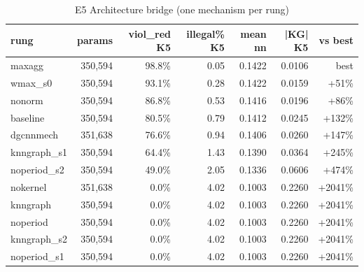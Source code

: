 \begin{table}[t]
\centering
\begin{tabular}{lrrrrrr}
\hline
rung & params & viol_red K5 & illegal\% K5 & mean nn & |KG| K5 & vs best \\
\hline
maxagg & 350,594 & 98.8\% & 0.05 & 0.1422 & 0.0106 & best \\
wmax_s0 & 350,594 & 93.1\% & 0.28 & 0.1422 & 0.0159 & +51\% \\
nonorm & 350,594 & 86.8\% & 0.53 & 0.1416 & 0.0196 & +86\% \\
baseline & 350,594 & 80.5\% & 0.79 & 0.1412 & 0.0245 & +132\% \\
dgcnnmech & 351,638 & 76.6\% & 0.94 & 0.1406 & 0.0260 & +147\% \\
knngraph_s1 & 350,594 & 64.4\% & 1.43 & 0.1390 & 0.0364 & +245\% \\
noperiod_s2 & 350,594 & 49.0\% & 2.05 & 0.1336 & 0.0606 & +474\% \\
nokernel & 351,638 & 0.0\% & 4.02 & 0.1003 & 0.2260 & +2041\% \\
knngraph & 350,594 & 0.0\% & 4.02 & 0.1003 & 0.2260 & +2041\% \\
noperiod & 350,594 & 0.0\% & 4.02 & 0.1003 & 0.2260 & +2041\% \\
knngraph_s2 & 350,594 & 0.0\% & 4.02 & 0.1003 & 0.2260 & +2041\% \\
noperiod_s1 & 350,594 & 0.0\% & 4.02 & 0.1003 & 0.2260 & +2041\% \\
\hline
\end{tabular}
\caption{E5 Architecture bridge (one mechanism per rung)}
\label{tab:e5}
\end{table}
